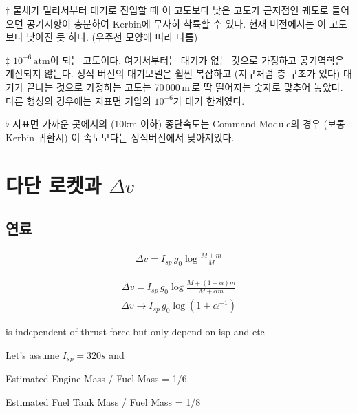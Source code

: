 \documentclass[9pt]{amsbook}
\begin{document}
\begin{table}
\begin{center}
\begin{threeparttable}
\begin{tabular}{|r|r|r|r|r|}
			\\\cline{4-5}
		\end{tabular}
	\begin{tablenotes}
		\item [$\dagger$] \small 물체가 멀리서부터 대기로 진입할 때 이 고도보다 낮은 고도가 근지점인 궤도로 들어오면
						 공기저항이 충분하여 Kerbin에 무사히 착륙할 수 있다.
						 현재 버전에서는 이 고도보다 낮아진 듯 하다. (우주선 모양에 따라 다름)
		\item[$\ddagger$] $10^{-6}\,\mathrm{atm}$이 되는 고도이다. 여기서부터는 대기가 없는 것으로 가정하고 공기역학은 계산되지 않는다. 정식 버전의 대기모델은 훨씬 복잡하고 (지구처럼 층 구조가 있다) 대기가 끝나는 것으로 가정하는 고도는 70\,000\,m\,로 딱 떨어지는 숫자로 맞추어 놓았다. 다른 행성의 경우에는 지표면 기압의 $10^{-6}$가 대기 한계였다. 
		\item[$\flat$] 지표면 가까운 곳에서의 (10km 이하) 종단속도는 Command Module의 경우 (보통 Kerbin 귀환시) 이 속도보다는 정식버전에서 낮아져있다.
	\end{tablenotes}
\end{threeparttable}
\end{center}
\end{table}

\chapter{다단 로켓과 $\Delta v$}
\section{연료}

\begin{align}
    \Delta v =I_{sp}\, g_0\log\frac{M+m}{M}
\end{align}

\begin{align}
    \Delta v = I_{sp}\, g_0\log\frac{M+(1+\alpha) m}{M+\alpha m}
\end{align}
\begin{align}
    \Delta v \rightarrow I_{sp}\, g_0\log(1+\alpha^{-1})
\end{align}

is independent of thrust force but only depend on isp and etc

Let's assume $I_{sp} =320 s$ and 

Estimated Engine Mass / Fuel Mass = 1/6

Estimated Fuel Tank Mass / Fuel Mass = 1/8
\end{document}
